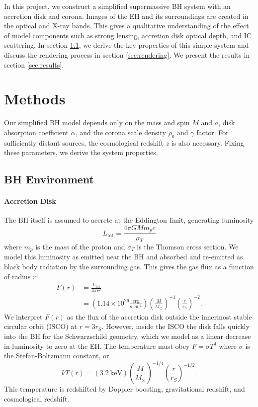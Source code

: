 \documentclass[twocolumn,twocolappendix]{aastex631}
\newcommand{\parens}[1]{\left(#1\right)}
\begin{document}
In this project, we construct a simplified supermassive BH system with an accretion disk and corona. Images of the EH and its surroundings are created in the optical and X-ray bands. This gives a qualitative understanding of the effect of model components such as strong lensing, accretion disk optical depth, and IC scattering. In section \ref{sec:environment}, we derive the key properties of this simple system and discuss the rendering process in section \ref{sec:rendering}. We present the results in section \ref{sec:results}.

\section{Methods}

Our simplified BH model depends only on the mass and spin $M$ and $a$, disk absorption coefficient $\alpha$, and the corona scale density $\rho_0$ and $\gamma$ factor. For sufficiently distant sources, the cosmological redshift $z$ is also necessary. Fixing these parameters, we derive the system properties.

\subsection{BH Environment}
\label{sec:environment}
\paragraph{Accretion Disk} The BH itself is assumed to accrete at the Eddington limit, generating luminosity 
\begin{equation}
  L_\text{tot} = \frac{4\pi GMm_pc}{\sigma_T}
\end{equation}
where $m_p$ is the mass of the proton and $\sigma_T$ is the Thomson cross section.
We model this luminosity as emitted near the BH and absorbed and re-emitted as black body radiation by the surrounding gas. This gives the gas flux as a function of radius $r$:
\begin{equation}
  \begin{split}
    F(r) &= \frac{L_\text{tot}}{4\pi r^2} \\&= \parens{1.14\times10^{26}\frac{\text{erg}}{\text{s\ cm}^2}}\parens{\frac{M}{M_\odot}}^{-1}\parens{\frac{r}{r_S}}^{-2}.
  \end{split}
\end{equation}
We interpret $F(r)$ as the flux of the accretion disk outside the innermost stable circular orbit (ISCO) at $r = 3r_S$. However, inside the ISCO the disk falls quickly into the BH for the Schwarzschild geometry, which we model as a linear decrease in luminosity to zero at the EH. The temperature must obey $F = \sigma T^4$ where $\sigma$ is the Stefan-Boltzmann constant, or
\begin{equation}
    kT(r) =(3.2\ \text{keV})\parens{\frac{M}{M_\odot}}^{-1/4}\parens{\frac{r}{r_S}}^{-1/2}.
    \label{eqn:disk-temp}
\end{equation}
This temperature is redshifted by Doppler boosting, gravitational redshift, and cosmological redshift.
\end{document}
